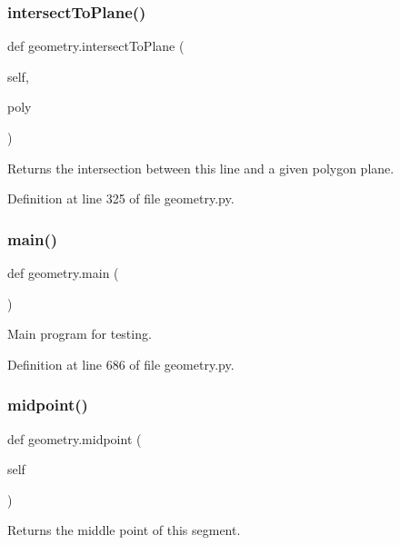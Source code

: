 \subsubsection{\texorpdfstring{intersect\+To\+Plane()}{intersectToPlane()}}
{\footnotesize\ttfamily def geometry.\+intersect\+To\+Plane (\begin{DoxyParamCaption}\item[{}]{self,  }\item[{}]{poly }\end{DoxyParamCaption})}

\begin{DoxyVerb}Returns the intersection between this line and a given polygon plane.\end{DoxyVerb}
 

Definition at line 325 of file geometry.\+py.

\mbox{\label{namespacegeometry_a284499afed4bfe4096ca1c78062a16bb}} 
\subsubsection{\texorpdfstring{main()}{main()}}
{\footnotesize\ttfamily def geometry.\+main (\begin{DoxyParamCaption}{ }\end{DoxyParamCaption})}

\begin{DoxyVerb}Main program for testing.\end{DoxyVerb}
 

Definition at line 686 of file geometry.\+py.

\mbox{\label{namespacegeometry_aa7e72b904b344b7d45b75f3942bc618b}} 
\subsubsection{\texorpdfstring{midpoint()}{midpoint()}}
{\footnotesize\ttfamily def geometry.\+midpoint (\begin{DoxyParamCaption}\item[{}]{self }\end{DoxyParamCaption})}

\begin{DoxyVerb}Returns the middle point of this segment.\end{DoxyVerb}
 

